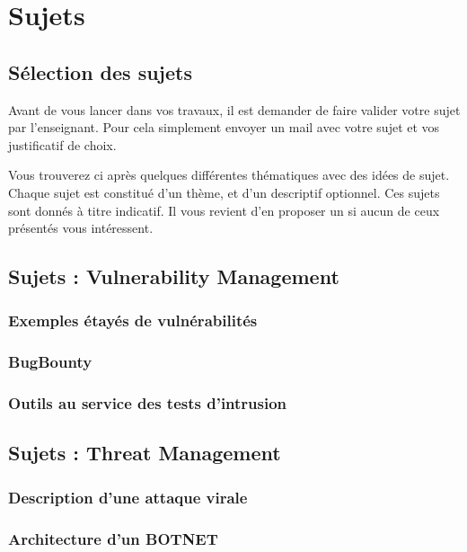 \section{Sujets}

\subsection{Sélection des sujets}
Avant de vous lancer dans vos travaux, il est demander de faire valider votre sujet par l'enseignant. Pour cela simplement envoyer un mail avec votre sujet et vos justificatif de choix.

Vous trouverez ci après quelques différentes thématiques avec des idées de sujet. Chaque sujet est constitué d'un thème, et d'un descriptif optionnel.
Ces sujets sont donnés à titre indicatif. Il vous revient d'en proposer un si aucun de ceux présentés vous intéressent.

\subsection{Sujets : Vulnerability Management}
\subsubsection{Exemples étayés de vulnérabilités}
\subsubsection{BugBounty}
\subsubsection{Outils au service des tests d'intrusion}



\subsection{Sujets : Threat Management}
\subsubsection{Description d'une attaque virale}
\subsubsection{Architecture d'un BOTNET}
